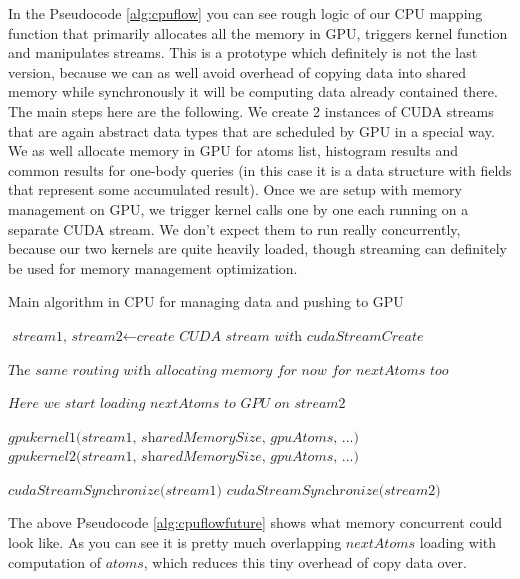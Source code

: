 \documentclass[12pt,letterpaper]{report}
\begin{document}
\noindent\hspace{3em}In the Pseudocode \ref{alg:cpuflow} you can see rough logic of our CPU mapping function that primarily allocates all the memory in GPU, triggers kernel function and manipulates streams. This is a prototype which definitely is not the last version, because we can as well avoid overhead of copying data into shared memory while synchronously it will be computing data already contained there. The main steps here are the following. We create 2 instances of CUDA streams that are again abstract data types that are scheduled by GPU in a special way. We as well allocate memory in GPU for atoms list, histogram results and common results for one-body queries (in this case it is a data structure with fields that represent some accumulated result). Once we are setup with memory management on GPU, we trigger kernel calls one by one each running on a separate CUDA stream. We don't expect them to run really concurrently, because our two kernels are quite heavily loaded, though streaming can definitely be used for memory management optimization.
\begin{algorithm}
\caption{Main algorithm in CPU for managing data and pushing to GPU}
\label{alg:cpuflowfuture}
\begin{algorithmic}[1]

\State $\textit{stream1, stream2} \gets \textit{create CUDA stream with cudaStreamCreate}$

\State
\State $\textit{The same routing with allocating memory for now for nextAtoms too}$

\State
\State $\textit{Here we start loading nextAtoms to GPU on stream2 }$
\State


\State $\textit{gpukernel1(stream1, sharedMemorySize, gpuAtoms, ...)}$
\State $\textit{gpukernel2(stream1, sharedMemorySize, gpuAtoms, ...)}$

\State
\State $\textit{cudaStreamSynchronize(stream1)}$
\State $\textit{cudaStreamSynchronize(stream2)}$

\EndFor

\EndProcedure
\end{algorithmic}
\end{algorithm}

\clearpage
\noindent\hspace{3em}The above Pseudocode \ref{alg:cpuflowfuture} shows what memory concurrent could look like. As you can see it is pretty much overlapping $nextAtoms$ loading with computation of $atoms$, which reduces this tiny overhead of copy data over.
\end{document}
